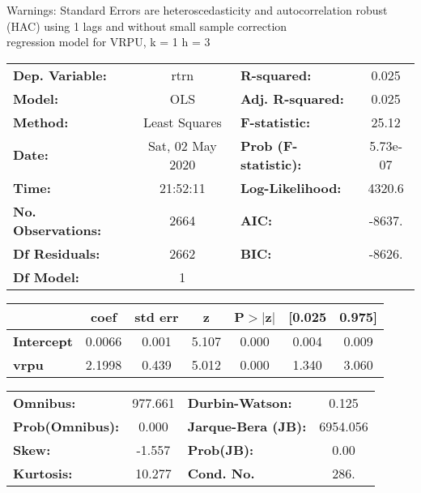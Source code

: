 Warnings: \newline
 [1] Standard Errors are heteroscedasticity and autocorrelation robust (HAC) using 1 lags and without small sample correction\\ 

regression model for VRPU, k = 1 h = 3\begin{center}
\begin{tabular}{lclc}
\toprule
\textbf{Dep. Variable:}    &       rtrn       & \textbf{  R-squared:         } &     0.025   \\
\textbf{Model:}            &       OLS        & \textbf{  Adj. R-squared:    } &     0.025   \\
\textbf{Method:}           &  Least Squares   & \textbf{  F-statistic:       } &     25.12   \\
\textbf{Date:}             & Sat, 02 May 2020 & \textbf{  Prob (F-statistic):} &  5.73e-07   \\
\textbf{Time:}             &     21:52:11     & \textbf{  Log-Likelihood:    } &    4320.6   \\
\textbf{No. Observations:} &        2664      & \textbf{  AIC:               } &    -8637.   \\
\textbf{Df Residuals:}     &        2662      & \textbf{  BIC:               } &    -8626.   \\
\textbf{Df Model:}         &           1      & \textbf{                     } &             \\
\bottomrule
\end{tabular}
\begin{tabular}{lcccccc}
                   & \textbf{coef} & \textbf{std err} & \textbf{z} & \textbf{P$> |$z$|$} & \textbf{[0.025} & \textbf{0.975]}  \\
\midrule
\textbf{Intercept} &       0.0066  &        0.001     &     5.107  &         0.000        &        0.004    &        0.009     \\
\textbf{vrpu}      &       2.1998  &        0.439     &     5.012  &         0.000        &        1.340    &        3.060     \\
\bottomrule
\end{tabular}
\begin{tabular}{lclc}
\textbf{Omnibus:}       & 977.661 & \textbf{  Durbin-Watson:     } &    0.125  \\
\textbf{Prob(Omnibus):} &   0.000 & \textbf{  Jarque-Bera (JB):  } & 6954.056  \\
\textbf{Skew:}          &  -1.557 & \textbf{  Prob(JB):          } &     0.00  \\
\textbf{Kurtosis:}      &  10.277 & \textbf{  Cond. No.          } &     286.  \\
\bottomrule
\end{tabular}
\end{center}

